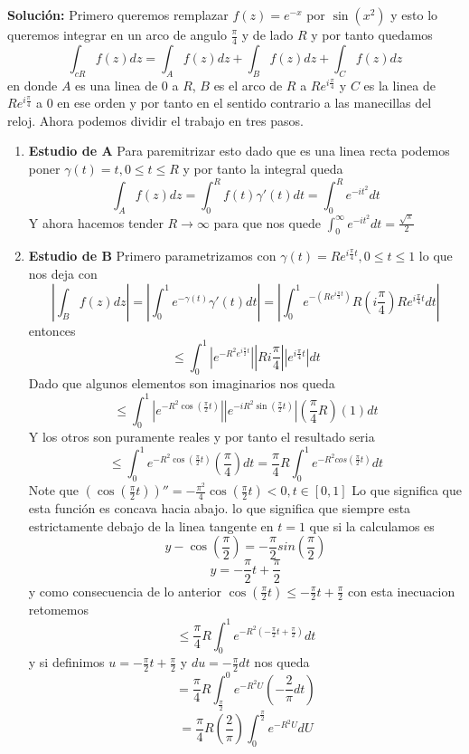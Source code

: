 \documentclass[12pt]{exam}
\begin{document}
\begin{enumerate}
    \textbf{Solución: }Primero queremos remplazar $f(z)=e^{-x}$ por $\sin(x^2)$ y esto lo queremos integrar en un arco de angulo $\frac{\pi}{4}$ y de lado $R$
    y por tanto quedamos $$\int_{cR} f(z) dz= \int_A f(z) dz + \int_B f(z) dz + \int_C f(z)dz$$
    en donde $A$ es una linea de $0$ a $R$, $B$ es el arco de $R$ a $Re^{i\frac{\pi}{4}}$ y $C$ es la linea de $Re^{i\frac{\pi}{4}}$ a $0$ en ese orden y por tanto
    en el sentido contrario a las manecillas del reloj. Ahora podemos dividir el trabajo en tres pasos.
    \begin{enumerate}
        \item \textbf{Estudio de A} Para paremitrizar esto dado que es una linea recta podemos poner $\gamma(t) = t, 0\leq t \leq R$ y por tanto la integral queda
        $$\int_A f(z) dz = \int_0^R f(t) \gamma'(t) dt = \int_{0}^{R}e^{-it^2}dt$$
        Y ahora hacemos tender $R\to\infty$ para que nos quede $\int_0^\infty e^{-it^2}dt = \frac{\sqrt{\pi}}{2}$
        \item \textbf{Estudio de B} Primero parametrizamos con $\gamma(t)=Re^{i\frac{\pi}{4}t},0\leq t \leq 1$  lo que nos deja con
        $$|\int_B f(z)dz| = |\int_0^1 e^{-\gamma(t)}\gamma'(t)dt| = |\int_0^1 e^{-(Re^{i\frac{\pi}{4}t})}R(i\frac{\pi}{4})Re^{i\frac{\pi}{4}t}dt|$$
        entonces
        $$\leq \int_0^1 |e^{-R^2e^{i\frac{\pi}{2}t}}||Ri\frac{\pi}{4}||e^{i\frac{\pi}{4}t}|dt$$
        Dado que algunos elementos son imaginarios nos queda
        $$\leq \int_0^1 |e^{-R^2 \cos(\frac{\pi}{2}t)}||e^{-iR^2\sin(\frac{\pi}{2}t)}|(\frac{\pi}{4}R) (1) dt$$
        Y los otros son puramente reales y por tanto el resultado seria
        $$\leq \int_0^1 e^{-R^2\cos(\frac{\pi}{2}t)}(\frac{\pi}{4})dt = \frac{\pi}{4}R\int_0^1e^{-R^2cos(\frac{\pi}{2}t)}dt$$
        Note que $(\cos(\frac{\pi}{2}t))'' = -\frac{\pi^2}{4}\cos(\frac{\pi}{2}t)<0, t \in [0,1]$ Lo que significa que esta función es concava hacia abajo. lo que significa
        que siempre esta estrictamente debajo de la linea tangente en $t=1$ que si la calculamos es 
        $$y - \cos(\frac{\pi}{2})=-\frac{\pi}{2}sin(\frac{\pi}{2})$$
        $$y =-\frac{\pi}{2}t+\frac{\pi}{2}$$
        y como consecuencia de lo anterior $\cos(\frac{\pi}{2}t)\leq -\frac{\pi}{2}t+\frac{\pi}{2}$ con esta inecuacion retomemos
        $$\leq \frac{\pi}{4}R\int_0^1e^{-R^2(-\frac{\pi}{2}t+\frac{\pi}{2})}dt$$
        y si  definimos $u=-\frac{\pi}{2}t+\frac{\pi}{2}$ y $du = -\frac{\pi}{2}dt$ nos queda
        $$=\frac{\pi}{4}R\int_{\frac{\pi}{2}}^0 e^{-R^2U}(-\frac{2}{\pi}dt)$$
        $$= \frac{\pi}{4}R(\frac{2}{\pi})\int_0^\frac{\pi}{2} e^{-R^2U}dU$$

\end{enumerate}
\end{enumerate}
\end{document}
